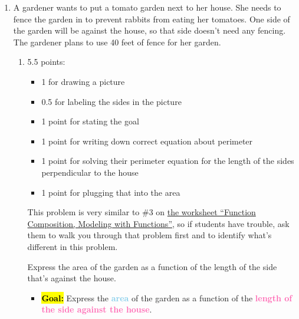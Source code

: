 \documentclass{article}
\newcommand{\goal}[1]{\textbf{\textcolor{skyblue}{#1}}}
\newcommand{\indvar}[1]{\textbf{\textcolor{hotpink}{#1}}}
\begin{document}
\begin{enumerate}[resume]
\item \label{modeling-fence-3-sides} %

  A gardener wants to put a tomato garden next to her house. She needs to fence the garden in to prevent rabbits from eating her tomatoes. One side of the garden will be against the house, so that side doesn't need any fencing. The gardener plans to use 40 feet of fence for her garden.

  \begin{enumerate}
  \item
    \begin{grading}
      5.5 points:
      \begin{itemize}[nosep]
      \item 1 for drawing a picture
      \item 0.5 for labeling the sides in the picture
      \item 1 point for stating the goal
      \item 1 point for writing down correct equation about perimeter
      \item 1 point for solving their perimeter equation for the length of the sides perpendicular to the house
      \item 1 point for plugging that into the area
      \end{itemize}
    \end{grading}

    \begin{workshop}
      This problem is very similar to {{\#3}} on \href{https://people.math.harvard.edu/~jjchen/mathma/docs/worksheets/worksheet06-sols.html}{the worksheet ``Function Composition, Modeling with Functions''}, 
      so if students have trouble, ask them to walk you through that
      problem first and to identify what's different in this problem.
    \end{workshop}

    \begin{problem}[\vfill]
      Express the area of the garden as a function of the length of
      the side that's against the house.
    \end{problem}

      \begin{solution}

        \begin{itemize}
        \item \hl{\textbf{Goal:}} Express the \goal{area} of the garden as a function of the 
        \indvar{length of the side against the house}.


\end{itemize}
\end{solution}
\end{enumerate}
\end{enumerate}
\end{document}
